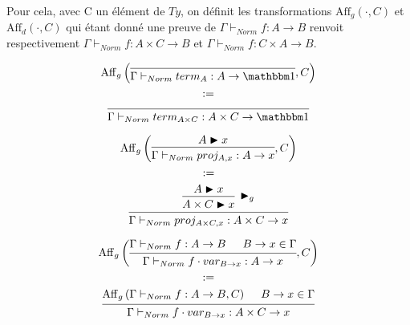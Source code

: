\documentclass[conference]{IEEEtran}
\begin{document}
	Pour cela, avec C un élément de $Ty$, on définit les transformations $\mathrm{Aff}_g(\cdot, C)$ et $\mathrm{Aff}_d(\cdot, C)$ qui étant donné une preuve de $\Gamma \vdash_{Norm} f : A \rightarrow B$ renvoit respectivement $\Gamma \vdash_{Norm} f : A \times C \rightarrow B$ et $\Gamma \vdash_{Norm} f : C \times A \rightarrow B$.
	
	\begin{align*}
		\begin{gathered}
			\mathrm{Aff}_g \left(
			\begin{prooftree}
				\infer0[]{\Gamma \vdash_{Norm} term_A : A \rightarrow \mathbbm 1}
			\end{prooftree}
			, C
			\right) \\
			:= \\
			\begin{prooftree}
				\infer0[]{\Gamma \vdash_{Norm} term_{A \times C} : A \times C \rightarrow \mathbbm 1}
			\end{prooftree}
		\end{gathered}
	\end{align*}
	
	\begin{align*}
		\begin{gathered}
			\mathrm{Aff}_g \left(
			\begin{prooftree}
				\hypo[]{A \blacktriangleright x}
				\infer1[]{\Gamma \vdash_{Norm} proj_{A,x} : A \rightarrow x}
			\end{prooftree} 
			, C
			\right) \\
			:= \\
			\begin{prooftree}
				\hypo[]{A \blacktriangleright x}
				\infer1[$\blacktriangleright_g$]{A \times C \blacktriangleright x}
				\infer1[]{\Gamma \vdash_{Norm} proj_{A \times C,x} : A \times C \rightarrow x}
			\end{prooftree}
		\end{gathered}
	\end{align*}
	
	\begin{align*}
		\begin{gathered}
			\mathrm{Aff}_g \left(
			\begin{prooftree}
				\hypo[]{\Gamma \vdash_{Norm} f : A \rightarrow B}
				\hypo[]{B \rightarrow x \in \Gamma}
				\infer2[]{\Gamma \vdash_{Norm} f \cdot var_{B \rightarrow x} : A \rightarrow x}
			\end{prooftree}
			, C
			\right) \\
			:= \\
			\begin{prooftree}
				\hypo[]{\mathrm{Aff}_g \left(\Gamma \vdash_{Norm} f : A \rightarrow B , C\right)}
				\hypo[]{B \rightarrow x \in \Gamma}
				\infer2[]{\Gamma \vdash_{Norm} f \cdot var_{B \rightarrow x} : A \times C \rightarrow x}
			\end{prooftree}
		\end{gathered}
	\end{align*}
	
\end{document}
